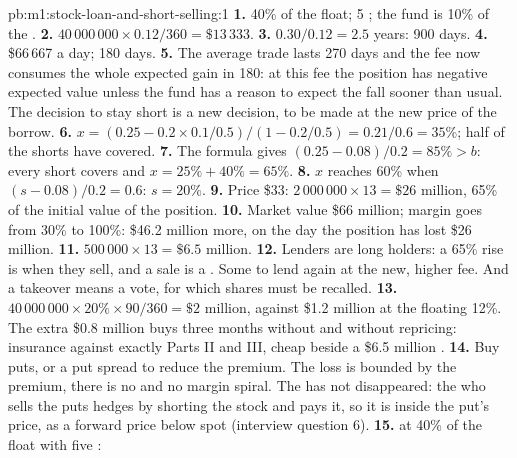 \begin{solution}{pb:m1:stock-loan-and-short-selling:1}
\textbf{1.} 40\% of the float; 5 ; the fund is 10\% of the .
\textbf{2.} $40\,000\,000 \times 0.12/360 = \$13\,333$.
\textbf{3.} $0.30/0.12 = 2.5$ years: 900 days.
\textbf{4.} \$66\,667 a day; 180 days.
\textbf{5.} The average trade lasts 270 days and the fee now consumes the
whole expected gain in 180: at this fee the position has negative expected
value unless the fund has a reason to expect the fall sooner than usual. The
decision to stay short is a new decision, to be made at the new price of
the borrow.
\textbf{6.} $x = (0.25 - 0.2 \times 0.1/0.5)/(1 - 0.2/0.5) = 0.21/0.6 = 35\%$;
half of the shorts have covered.
\textbf{7.} The formula gives $(0.25 - 0.08)/0.2 = 85\% > b$: every short
covers and $x = 25\% + 40\% = 65\%$.
\textbf{8.} $x$ reaches 60\% when $(s - 0.08)/0.2 = 0.6$: $s = 20\%$.
\textbf{9.} Price \$33: $2\,000\,000 \times 13 = \$26$ million, 65\% of the
initial value of the position.
\textbf{10.} Market value \$66 million; margin goes from 30\% to 100\%:
\$46.2 million more, on the day the position has lost \$26 million.
\textbf{11.} $500\,000 \times 13 = \$6.5$ million.
\textbf{12.} Lenders are long holders: a 65\% rise is when they sell, and a
sale is a . Some  to lend again at the new, higher fee. And a
takeover means a vote, for which shares must be recalled.
\textbf{13.} $40\,000\,000 \times 20\% \times 90/360 = \$2$ million, against
\$1.2 million at the floating 12\%. The extra \$0.8 million buys three months
without  and without repricing: insurance against exactly Parts II and
III, cheap beside a \$6.5 million .
\textbf{14.} Buy puts, or a put spread to reduce the premium. The loss is
bounded by the premium, there is no  and no margin spiral. The  has not disappeared: the  who sells the puts hedges by
shorting the stock and pays it, so it is inside the put's price, as a forward
price below spot (interview question 6).
\textbf{15.}  at 40\% of the float with five :

\end{solution}
